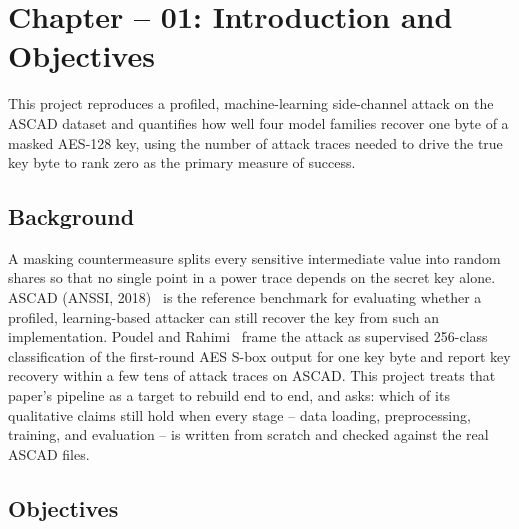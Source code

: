 \clearpage
\section[Introduction and Objectives]{Chapter -- 01: Introduction and Objectives}

This project reproduces a profiled, machine-learning side-channel attack on the ASCAD
dataset and quantifies how well four model families recover one byte of a masked
AES-128 key, using the number of attack traces needed to drive the true key byte to
rank zero as the primary measure of success.

\subsection{Background}

A masking countermeasure splits every sensitive intermediate value into random shares
so that no single point in a power trace depends on the secret key alone. ASCAD
(ANSSI, 2018)~\cite{benadjila2020} is the reference benchmark for evaluating whether a
profiled, learning-based attacker can still recover the key from such an
implementation. Poudel and Rahimi~\cite{poudel2025} frame the attack as supervised
256-class classification of the first-round AES S-box output for one key byte and
report key recovery within a few tens of attack traces on ASCAD. This project treats
that paper's pipeline as a target to rebuild end to end, and asks: which of its
qualitative claims still hold when every stage -- data loading, preprocessing,
training, and evaluation -- is written from scratch and checked against the real
ASCAD files.

\subsection{Objectives}

